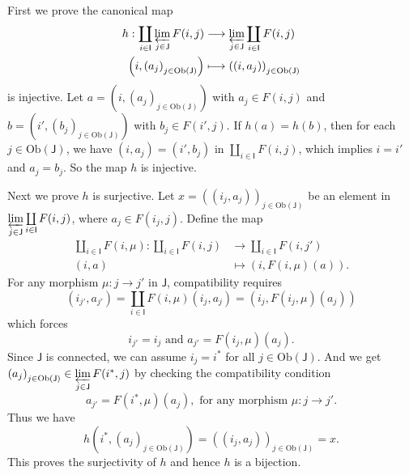 \begin{prf}
\begin{enumerate}[(i)]
    First we prove the canonical map
        \begin{align*}
            h:\coprod_{i\in\mathsf{I}}\varprojlim_{j\in\mathsf{J}} F(i,j)&\longrightarrow \varprojlim_{j\in\mathsf{J}}\coprod_{i\in\mathsf{I}} F(i,j)\\
            \left(i,\left(a_j\right)_{j\in\mathrm{Ob}(\mathsf{J})}\right)&\longmapsto \left(\left(i,a_j\right)\right)_{j\in\mathrm{Ob}(\mathsf{J})}
        \end{align*}
        is injective. Let $a=\left(i,\left(a_j\right)_{j\in\mathrm{Ob}(\mathsf{J})}\right)$ with $a_j\in F(i,j)$ and $b=\left(i',\left(b_j\right)_{j\in\mathrm{Ob}(\mathsf{J})}\right)$ with $b_j\in F(i',j)$. If $h(a)=h(b)$, then for each $j\in \mathrm{Ob}(\mathsf{J})$, we have $\left(i,a_j\right)=\left(i',b_j\right)$ in $\coprod\limits_{i\in\mathsf{I}} F(i,j)$, which implies $i=i'$ and $a_j=b_j$. So the map $h$ is injective. 

        Next we prove $h$ is surjective. Let $x=\left(\left(i_j,a_j\right)\right)_{j\in\mathrm{Ob}(\mathsf{J})}$ be an element in $\varprojlim\limits_{j\in\mathsf{J}}\coprod\limits_{i\in\mathsf{I}} F(i,j)$, where $a_j\in F(i_j,j)$. Define the map
        \begin{align*}
            \coprod_{i\in\mathsf{I}} F(i,\mu):\coprod_{i\in\mathsf{I}} F(i,j)&\longrightarrow \coprod_{i\in\mathsf{I}} F(i,j')\\
            \left(i,a\right)&\longmapsto \left(i,F(i,\mu)(a)\right).
        \end{align*}
        For any morphism $\mu:j\to j'$ in $\mathsf{J}$, compatibility requires 
        \[
            \left(i_{j'},a_{j'}\right)=\coprod_{i\in\mathsf{I}} F(i,\mu) \left(i_j,a_j\right)=\left(i_j,F(i_j,\mu)(a_j)\right)
        \]
        which forces
        \[
            i_{j'}=i_j\text{ and }a_{j'}=F(i_j,\mu)(a_j).
        \] 
        Since $\mathsf{J}$ is connected, we can assume $i_j=i^*$ for all $j\in \mathrm{Ob}(\mathsf{J})$. And we get $\left(a_j\right)_{j\in\mathrm{Ob}(\mathsf{J})}\in \varprojlim\limits_{j\in\mathsf{J}} F(i^*,j)$ by checking the compatibility condition
        \[
            a_{j'}=F(i^*,\mu)(a_j),  \text{ for any morphism }\mu:j\to j'.
        \]
        Thus we have 
        \[
            h\left(i^*, \left(a_j\right)_{j\in\mathrm{Ob}(\mathsf{J})}\right)=\left(\left(i_j,a_j\right)\right)_{j\in\mathrm{Ob}(\mathsf{J})}=x.
        \]
        This proves the surjectivity of $h$ and hence $h$ is a bijection.
    \end{enumerate}
\end{prf}



